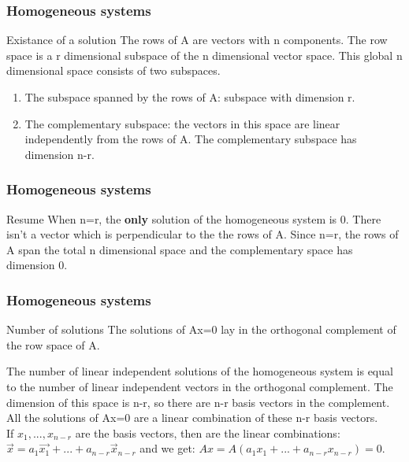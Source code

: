 \begin{frame}
	\frametitle{Homogeneous systems}
	\begin{block}{Existance of a solution}
		The rows of A are vectors with n components. The row space is a r dimensional subspace of the n dimensional vector space. This global n dimensional space consists of two subspaces. 
		\begin{enumerate}
			\item The subspace spanned by the rows of A: subspace with dimension r. 
			\item The complementary subspace: the vectors in this space are linear independently from the rows of A. The complementary subspace has dimension n-r. 
		\end{enumerate} 
	\end{block}
\end{frame}

\begin{frame}
	\frametitle{Homogeneous systems}
	\begin{block}{Resume}
		When n=r, the \textbf{only} solution of the homogeneous system is 0. There isn't a vector which is perpendicular to the the rows of A. Since n=r, the rows of A span the total n dimensional space and the complementary space has dimension 0.\vspace{4mm}
	\end{block}
\end{frame}

\begin{frame}
	\frametitle{Homogeneous systems}
	\begin{block}{Number of solutions}
		The solutions of Ax=0 lay in the orthogonal complement of the row space of A. \vspace{4mm}
		
		The number of linear independent solutions of the homogeneous system is equal to the number of linear independent vectors in the orthogonal complement. The dimension of this space is n-r, so there are n-r basis vectors in the complement. All the solutions of Ax=0 are a linear combination of these n-r basis vectors.\\
		If $x_1,...,x_{n-r}$ are the basis vectors, then are the linear combinations: $\overrightarrow{x}=a_1\overrightarrow{x_1}+...+a_{n-r}\overrightarrow{x}_{n-r}$ and we get: $Ax=A(a_1x_1+...+a_{n-r}x_{n-r})=0$.
	\end{block}
\end{frame}

